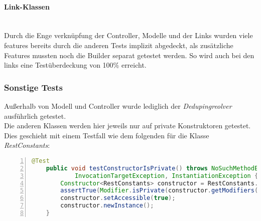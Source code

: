 \paragraph{Link-Klassen}\mbox{}\\
Durch die Enge verknüpfung der Controller, Modelle und der Links wurden viele features bereits durch die anderen Tests implizit abgedeckt, als zusätzliche Features mussten noch die Builder separat getestet werden.
So wird auch bei den links eine Testüberdeckung von 100\% erreicht.

\subsubsection{Sonstige Tests}
Außerhalb von Modell und Controller wurde lediglich der \textit{Dedupingreolver} ausführlich getestet.
\\
Die anderen Klassen werden hier jeweils nur auf private Konstruktoren getestet.
Dies geschieht mit einem Testfall wie dem folgenden für die Klasse \textit{RestConstants}:
\begin{lstlisting}[language=java,
    basicstyle=\normalfont\ttfamily,
    numbers=left,
    numberstyle=\scriptsize,
    stepnumber=1,
    numbersep=8pt,
    showstringspaces=false,
    breaklines=true,
    frame=lines,
    backgroundcolor=\color{background}]
    @Test
    public void testConstructorIsPrivate() throws NoSuchMethodException, IllegalAccessException,
            InvocationTargetException, InstantiationException {
        Constructor<RestConstants> constructor = RestConstants.class.getDeclaredConstructor();
        assertTrue(Modifier.isPrivate(constructor.getModifiers()));
        constructor.setAccessible(true);
        constructor.newInstance();
    }
\end{lstlisting}